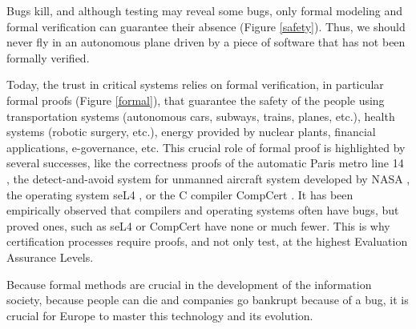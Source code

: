 \thispagestyle{empty}

Bugs kill, and although testing may reveal some bugs, only formal
modeling and formal verification can guarantee their absence (Figure
\ref{safety}).  Thus, we should never fly in an autonomous plane driven by a
piece of software that has not been formally verified.

Today, the trust in critical systems relies on formal verification, in
particular formal proofs (Figure \ref{formal}), that guarantee the
safety of the people using transportation systems (autonomous cars,
subways, trains, planes, etc.), health systems (robotic surgery,
etc.), energy provided by nuclear plants, financial applications,
e-governance, etc. This crucial role of formal proof is highlighted by
several successes, like the correctness proofs of the automatic Paris
metro line 14 \cite{metro14}, the detect-and-avoid system for unmanned
aircraft system developed by NASA \cite{Munoz16}, the operating system
seL4 \cite{Klein09}, or the C compiler CompCert \cite{Leroy06}.  It
has been empirically observed that compilers and operating systems
often have bugs, but proved ones, such as seL4 or CompCert have none
or much fewer.  This is why certification processes require proofs,
and not only test, at the highest Evaluation Assurance Levels.

Because formal methods are crucial in the development of the
information society, because people can die and companies go bankrupt
because of a bug, it is crucial for Europe to master this technology
and its evolution.

